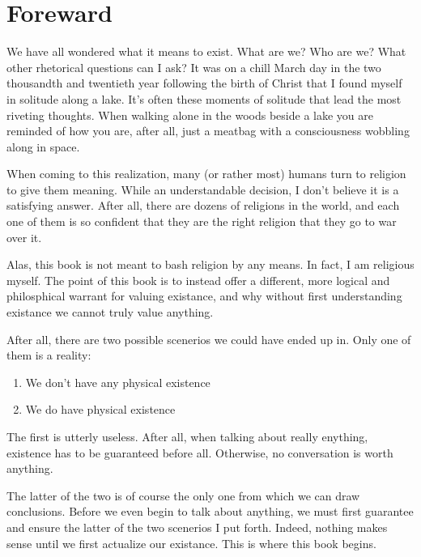 \chapter{Foreward}

We have all wondered what it means to exist. What are we? Who are we? What other rhetorical questions
can I ask? It was on a chill March day in the two thousandth and twentieth year following the birth of Christ
that I found myself in solitude along a lake. It's often these moments of solitude that lead the most riveting
thoughts. When walking alone in the woods beside a lake you are reminded of how you are, after all, just a 
meatbag with a consciousness wobbling along in space.

When coming to this realization, many (or rather most) humans turn to religion to give them meaning. While
an understandable decision, I don't believe it is a satisfying answer. After all, there are dozens of religions
in the world, and each one of them is so confident that they are the right religion that they go to war over
it.

Alas, this book is not meant to bash religion by any means. In fact, I am religious myself. The point of
this book is to instead offer a different, more logical and philosphical warrant for valuing existance, and
why without first understanding existance we cannot truly value anything.

\pagebreak

After all, there are two possible scenerios we could have ended up in. Only one of them is a reality:

\begin{enumerate}
    \item We don't have any physical existence
    \item We do have physical existence
\end{enumerate}

The first is utterly useless. After all, when talking about really enything, existence has to be guaranteed
before all. Otherwise, no conversation is worth anything.

The latter of the two is of course the only one from which we can draw conclusions. Before we even begin
to talk about anything, we must first guarantee and ensure the latter of the two scenerios I put forth. Indeed, nothing
makes sense until we first actualize our existance. This is where this book begins.